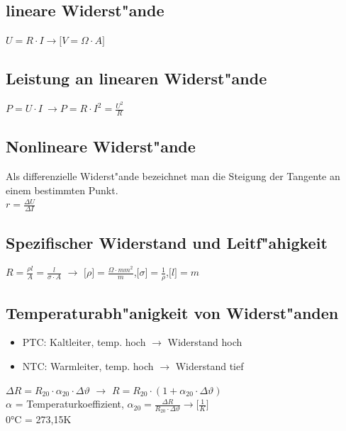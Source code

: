 \begin{multicols}{2}
\subsection{lineare Widerst"ande}
$U=R \cdot I \rightarrow \lbrack V = \Omega  \cdot  A \rbrack$ \\

\subsection{Leistung an linearen Widerst"ande}
$P=U \cdot I \ \rightarrow P=R \cdot I^2 = \frac{U^2}{R}$

\subsection{Nonlineare Widerst"ande}
Als differenzielle Widerst"ande bezeichnet man die Steigung der Tangente an einem bestimmten Punkt.\\
$r = \frac{\Delta U}{\Delta I}$\\

\subsection{Spezifischer Widerstand und Leitf"ahigkeit}
$R=\frac{\rho \mathit{l}}{A}=\frac{\mathit{l}}{\sigma \cdot A}$ $\rightarrow$ $\lbrack \rho \rbrack = \frac{ \Omega \cdot mm^2}{m}$,$\lbrack \sigma \rbrack = \frac{1}{\rho}$,$ \lbrack \mathit{l} \rbrack = m$

\subsection{Temperaturabh"anigkeit von Widerst"anden}
\begin{itemize}
	\item PTC: Kaltleiter, temp. hoch $\rightarrow$ Widerstand hoch
	\item NTC: Warmleiter, temp. hoch $\rightarrow$ Widerstand tief
\end{itemize}
$\Delta R = R_{20} \cdot \alpha_{20} \cdot \Delta \vartheta$ $\rightarrow$ $R = R_{20} \cdot (1 + \alpha_{20} \cdot \Delta \vartheta)$\\
$\alpha$ = Temperaturkoeffizient, $\alpha_{20}=\frac{\Delta R}{ R_{20} \cdot \Delta \vartheta} \rightarrow \lbrack \frac{1}{K} \rbrack$\\
0°C = 273,15K

\end{multicols}

